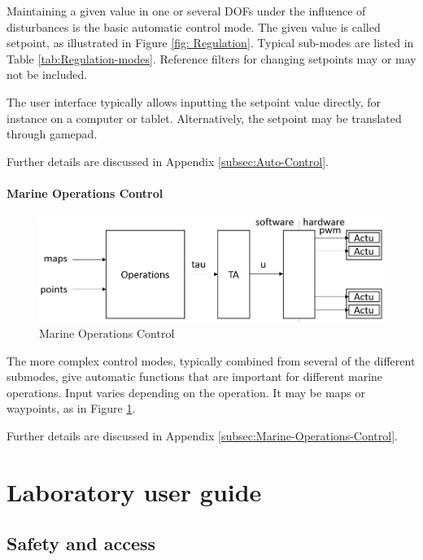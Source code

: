 \documentclass[a4paper,twoside,english]{report}
\begin{document}
Maintaining a given value in one or several DOFs under the influence
of disturbances is the basic automatic control mode. The given value
is called setpoint, as illustrated in Figure \ref{fig: Regulation}.
Typical sub-modes are listed in Table \ref{tab:Regulation-modes}.
Reference filters for changing setpoints may or may not be included.

The user interface typically allows inputting the setpoint value directly,
for instance on a computer or tablet. Alternatively, the setpoint
may be translated through gamepad.

Further details are discussed in Appendix \ref{subsec:Auto-Control}.

\subsection{\label{subsec:Marine-Operations-Control-1}Marine Operations Control}

\begin{figure}
\centering \includegraphics[scale=0.45]{fig/ctrl_operations} \caption{\label{fig: Marine Operations Control}Marine Operations Control}
\end{figure}

The more complex control modes, typically combined from several of
the different submodes, give automatic functions that are important
for different marine operations. Input varies depending on the operation.
It may be maps or waypoints, as in Figure \ref{fig: Marine Operations Control}.

Further details are discussed in Appendix \ref{subsec:Marine-Operations-Control}.


\part{Laboratory user guide}\label{part: Laboratory user guide}

\chapter{Safety and access}
\end{document}
